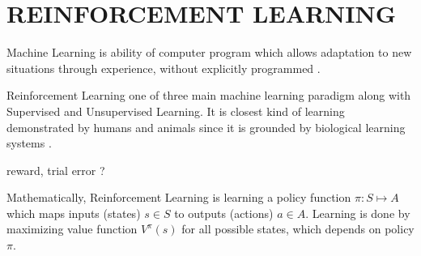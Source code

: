 \chapter{REINFORCEMENT LEARNING}

\label{chap:rl_chap}

Machine Learning is ability of computer program which allows adaptation to new situations through experience, without explicitly programmed \cite{mitchell_machine_1997}.

Reinforcement Learning one of three main machine learning paradigm along with Supervised and Unsupervised Learning. It is closest kind of learning demonstrated by humans and animals since it is grounded by biological learning systems \cite{sutton_reinforcement_1998}.

reward, trial error ?

Mathematically, Reinforcement Learning is learning a policy function $\pi \colon S \mapsto A$ which maps inputs (states) $s \in S$ to outputs (actions) $a \in A$. Learning is done by maximizing value function $V^{\pi}(s)$ for all possible states, which depends on policy $\pi$.